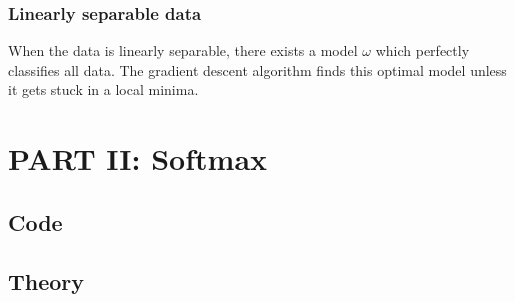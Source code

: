 \documentclass{article}
\begin{document}
	\subsubsection*{Linearly separable data}
	When the data is linearly separable, there exists a model $\omega$ which perfectly classifies all data.
	The gradient descent algorithm finds this optimal model unless it gets stuck in a local minima.
	
\section*{PART II: Softmax}
\subsection*{Code}
\subsection*{Theory}	
	
\end{document}
